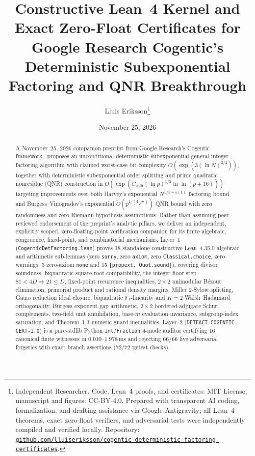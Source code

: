 \documentclass[10pt,twocolumn]{article}
\title{\vspace{-0.9em}\textbf{Constructive Lean~4 Kernel and Exact Zero-Float Certificates for Google Research Cogentic's Deterministic Subexponential Factoring and QNR Breakthrough}}
\author{Lluis Eriksson\thanks{Independent Researcher. Code, Lean~4 proofs, and certificates: MIT License; manuscript and figures: CC-BY-4.0. Prepared with transparent AI coding, formalization, and drafting assistance via Google Antigravity; all Lean~4 theorems, exact zero-float verifiers, and adversarial tests were independently compiled and verified locally. Repository: \href{https://github.com/lluiseriksson/cogentic-deterministic-factoring-certificates}{\nolinkurl{github.com/lluiseriksson/cogentic-deterministic-factoring-certificates}}.}}
\date{November 25, 2026}
\newcommand{\FF}{\mathbb{F}}
\begin{document}
\maketitle
\vspace{-1.2em}

\begin{abstract}
A November~25, 2026 companion preprint from Google Research's Cogentic framework~\cite{cogentic2026detfactoring,cai2026cogentic} proposes an unconditional deterministic subexponential general integer factoring algorithm with claimed worst-case bit complexity $O(\exp(3(\ln N)^{3/4}))$, together with deterministic subexponential order splitting and prime quadratic nonresidue (QNR) construction in $O(\exp(C_{\mathrm{split}}(\ln p)^{1/2}\ln\ln(p+16)))$—targeting improvements over both Harvey's exponential $N^{1/5+o(1)}$ factoring bound and Burgess--Vinogradov's exponential $\tilde{O}(p^{1/(4\sqrt{e})})$ QNR bound with zero randomness and zero Riemann-hypothesis assumptions. Rather than assuming peer-reviewed endorsement of the preprint's analytic pillars, we deliver an independent, explicitly scoped, zero-floating-point verification companion for its finite algebraic, congruence, fixed-point, and combinatorial mechanisms. Layer~1 (\nolinkurl{CogenticDetFactoring.lean}) proves 18 standalone constructive Lean~4.35.0 algebraic and arithmetic sub-lemmas (zero \texttt{sorry}, zero \texttt{axiom}, zero \texttt{Classical.choice}, zero warnings; 3 zero-axiom \texttt{none} and 15 \texttt{[propext, Quot.sound]}), covering divisor soundness, biquadratic square-root compatibility, the integer floor step $81<4D\Rightarrow 21\le D$, fixed-point recurrence inequalities, $2{\times}2$ unimodular Bézout elimination, primorial product and rational density margins, Miller 2-Sylow splitting, Gauss reduction ideal closure, biquadratic $\FF_2$-linearity and $K=2$ Walsh--Hadamard orthogonality, Burgess exponent gap arithmetic, $2{\times}2$ bordered-adjugate Schur complements, two-field unit annihilation, base-$m$ evaluation invariance, subgroup-index saturation, and Theorem~1.3 numeric guard inequalities. Layer~2 (\texttt{DETFACT-\allowbreak COGENTIC-\allowbreak CERT-1.0}) is a pure-stdlib Python \texttt{int}/\texttt{Fraction} 4-mode auditor certifying 16 canonical finite witnesses in $0.010$--$1.978\,\mathrm{ms}$ and rejecting 66/66 live adversarial forgeries with exact branch assertions (72/72 pytest checks).
\end{abstract}
\end{document}

